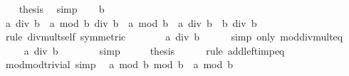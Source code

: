 \begin{isabellebody}
\ \ \isamarkupfalse%
\ {\isacharquery}{\kern0pt}thesis\ \isamarkupfalse%
\ simp\isanewline
{}\isamarkupfalse%
\isanewline
\ \ \isamarkupfalse%
\ {\isachardoublequoteopen}b\ {\isasymnoteq}\ {}{\isachardoublequoteclose}\isanewline
\ \ \isamarkupfalse%
\ {\isachardoublequoteopen}a\ div\ b\ {\isacharplus}{\kern0pt}\ a\ mod\ b\ div\ b\ {\isacharequal}{\kern0pt}\ {\isacharparenleft}{\kern0pt}a\ mod\ b\ {\isacharplus}{\kern0pt}\ a\ div\ b\ {\isacharasterisk}{\kern0pt}\ b{\isacharparenright}{\kern0pt}\ div\ b{\isachardoublequoteclose}\isanewline
\ \ \ \ \isamarkupfalse%
\ {\isacharparenleft}{\kern0pt}rule\ div{\isacharunderscore}{\kern0pt}mult{\isacharunderscore}{\kern0pt}self{}\ {\isacharbrackleft}{\kern0pt}symmetric{\isacharbrackright}{\kern0pt}{\isacharparenright}{\kern0pt}\isanewline
\ \ \isamarkupfalse%
\ \isamarkupfalse%
\ {\isachardoublequoteopen}{\isasymdots}\ {\isacharequal}{\kern0pt}\ a\ div\ b{\isachardoublequoteclose}\isanewline
\ \ \ \ \isamarkupfalse%
\ {\isacharparenleft}{\kern0pt}simp\ only{\isacharcolon}{\kern0pt}\ mod{\isacharunderscore}{\kern0pt}div{\isacharunderscore}{\kern0pt}mult{\isacharunderscore}{\kern0pt}eq{\isacharparenright}{\kern0pt}\isanewline
\ \ \isamarkupfalse%
\ \isamarkupfalse%
\ {\isachardoublequoteopen}{\isasymdots}\ {\isacharequal}{\kern0pt}\ a\ div\ b\ {\isacharplus}{\kern0pt}\ {}{\isachardoublequoteclose}\isanewline
\ \ \ \ \isamarkupfalse%
\ simp\isanewline
\ \ \isamarkupfalse%
\ \isamarkupfalse%
\ {\isacharquery}{\kern0pt}thesis\isanewline
\ \ \ \ \isamarkupfalse%
\ {\isacharparenleft}{\kern0pt}rule\ add{\isacharunderscore}{\kern0pt}left{\isacharunderscore}{\kern0pt}imp{\isacharunderscore}{\kern0pt}eq{\isacharparenright}{\kern0pt}\isanewline
{}\isamarkupfalse%
%
\endisatagproof
{\isafoldproof}%
%
\isadelimproof
\isanewline
%
\endisadelimproof
\isanewline
{}\isamarkupfalse%
\ mod{\isacharunderscore}{\kern0pt}mod{\isacharunderscore}{\kern0pt}trivial\ {\isacharbrackleft}{\kern0pt}simp{\isacharbrackright}{\kern0pt}{\isacharcolon}{\kern0pt}\isanewline
\ \ {\isachardoublequoteopen}a\ mod\ b\ mod\ b\ {\isacharequal}{\kern0pt}\ a\ mod\ b{\isachardoublequoteclose}\isanewline
%
\isadelimproof
%
\endisadelimproof
%
\isatagproof
{}\isamarkupfalse%
\ {\isacharminus}{\kern0pt}\isanewline
\ \ \isamarkupfalse%

\end{isabellebody}
